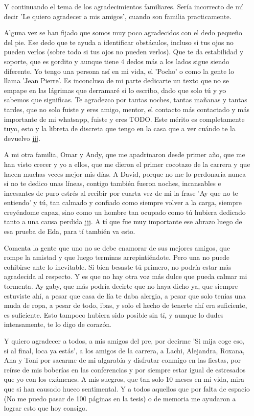 \begin{acknowledgements}
    Y continuando el tema de los agradecimientos familiares. Sería incorrecto de mí decir 'Le quiero agradecer a mis amigos', cuando son familia practicamente.

    Alguna vez se han fijado que somos muy poco agradecidos con el dedo pequeño del pie. Ese dedo que te ayuda a identificar obstáculos, incluso si tus ojos no pueden verlos (sobre todo si tus ojos no pueden verlos). Que te da estabilidad y soporte, que es gordito y aunque tiene 4 dedos más a los lados sigue siendo diferente. Yo tengo una persona así en mi vida, el 'Pocho' o como la gente lo llama 'Jean Pierre'. Es inconcluso de mi parte dedicarte un texto que no se empape en las lágrimas que derramaré si lo escribo, dado que solo tú y yo sabemos que significas. Te agradezco por tantas noches, tantas mañanas y tantas tardes, que no solo fuiste y eres amigo, mentor, el contacto más contactado y más importante de mi whatsapp, fuiste y eres TODO. Este mérito es completamente tuyo, esto y la libreta de discreta que tengo en la casa que a ver cuándo te la devuelvo jjj.
    
    A mi otra familia, Omar y Andy, que me apadrinaron desde primer año, que me han visto crecer y yo a ellos, que me dieron el primer cocotazo de la carrera y que hacen muchas veces mejor mis días. A David, porque no me lo perdonaría nunca si no te dedico unas líneas, contigo también fueron noches, incansables e incesantes de puro estrés al recibir por cuarta vez de mi la frase 'Ay que no te entiendo' y tú, tan calmado y confiado como siempre volver a la carga, siempre creyéndome capaz, sino como un hombre tan ocupado como tú hubiera dedicado tanto a una causa perdida jjj. A tí que fue muy importante ese abrazo luego de esa prueba de Eda, para tí también va esto.

    Comenta la gente que uno no se debe enamorar de sus mejores amigos, que rompe la amistad y que luego terminas arrepintiéndote. Pero una no puede cohibirse ante lo inevitable. Si bien besaste tú primero, no podría estar más agradecida al respecto. Y es que no hay otra voz más dulce que pueda calmar mi tormenta. Ay gaby, que más podría decirte que no haya dicho ya, que siempre estuviste ahí, a pesar que casa de lía te daba alergia, a pesar que solo tenías una muda de ropa, a pesar de todo, ibas, y solo el hecho de tenerte ahí era suficiente, es suficiente. Esto tampoco hubiera sido posible sin tí, y aunque lo dudes intensamente, te lo digo de corazón.

    Y quiero agradecer a todos, a mis amigos del pre, por decirme 'Si mija coge eso, si al final, loca ya estás', a los amigos de la carrera, a Lachi, Alejandra, Roxana, Ana y Toni por sacarme de mi algarabía y disfrutar conmigo en las fiestas, por reírse de mis boberías en las conferencias y por siempre estar igual de estresados que yo con los exámenes. A mis suegros, que tan solo 10 meses en mi vida, mira que si han causado hueco sentimental. Y a todos aquellos que por falta de espacio (No me puedo pasar de 100 páginas en la tesis) o de memoria me ayudaron a lograr esto que hoy consigo.


\end{acknowledgements}